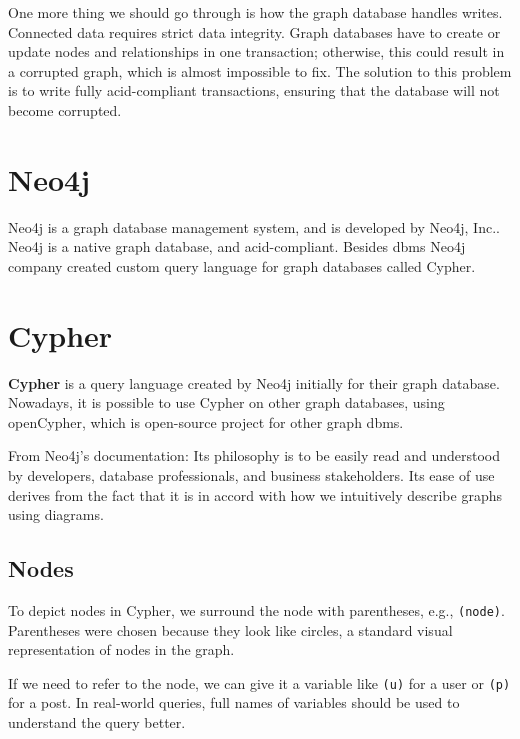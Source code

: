 One more thing we should go through is how the graph database handles writes. Connected data requires strict data integrity.
Graph databases have to create or update nodes and relationships in one transaction; otherwise, this could result in a corrupted graph, which is almost impossible to fix.
The solution to this problem is to write fully \acrshort{acid}-compliant transactions, ensuring that the database will not become corrupted.
\cite{chao_graph_2018}

\section{Neo4j}

Neo4j is a graph database management system, and is developed by Neo4j, Inc.. \cite{noauthor_company_nodate}
Neo4j is a native graph database, and \acrshort{acid}-compliant.
Besides \acrshort{dbms} Neo4j company created custom query language for graph databases called Cypher. \cite{noauthor_neo4j_nodate-2}

\section{Cypher}

\textbf{Cypher} is a query language created by Neo4j initially for their graph database.
Nowadays, it is possible to use Cypher on other graph databases, using openCypher, which is open-source project for other graph \acrshort{dbms}. \cite{noauthor_resources_nodate}

From Neo4j's documentation: Its philosophy is to be easily read and understood by developers, database professionals, and business stakeholders.
Its ease of use derives from the fact that it is in accord with how we intuitively describe graphs using diagrams. \cite{robinson_graph_2015}

\subsection{Nodes}

To depict nodes in Cypher, we surround the node with parentheses, e.g., \texttt{(node)}.
Parentheses were chosen because they look like circles, a standard visual representation of nodes in the graph. \cite{noauthor_getting_nodate}

If we need to refer to the node, we can give it a variable like \texttt{(u)} for a user or \texttt{(p)} for a post.
In real-world queries, full names of variables should be used to understand the query better.

